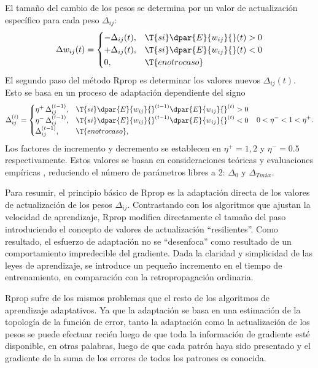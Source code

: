El tamaño del cambio de los pesos se determina por un
valor de actualización específico para cada peso $\Delta_{ij}$:
%
\begin{align}
\label{mlp20}
  \Delta{}w_{ij}(t) = 
  \begin{cases}
    -\Delta_{ij}(t), & \T{si } \dpar{E}{w_{ij}}{}(t) > 0 \\
    +\Delta_{ij}(t), & \T{si } \dpar{E}{w_{ij}}{}(t) < 0 \\
    0, & \T{en otro caso}
  \end{cases}
\end{align}
%
El segundo paso del método Rprop es determinar los valores nuevos
$\Delta_{ij}(t)$. Esto se basa en un proceso de adaptación dependiente
del signo
%
\begin{align}
\label{mlp20}
  \Delta{}_{ij}^{(t)} = 
  \begin{cases}
    \eta^+\,\Delta_{ij}^{(t-1)}, & \T{si }\dpar{E}{w_{ij}}{}^{(t-1)}
      \dpar{E}{w_{ij}}{}^{(t)} > 0 \\
    \eta^-\,\Delta_{ij}^{(t-1)}, & \T{si }\dpar{E}{w_{ij}}{}^{(t-1)}
      \dpar{E}{w_{ij}}{}^{(t)} < 0 \\
    \Delta_{ij}^{(t-1)}, & \T{en otro caso},
  \end{cases}
  && 0<\eta^-<1<\eta^+.
\end{align}
%
Los factores de incremento y decremento se establecen en $\eta^+=1,2$
y $\eta^-=0.5$ respectivamente. Estos valores se basan en
consideraciones teóricas y evaluaciones empíricas \cite{riedmiller},
reduciendo el número de parámetros libres a 2: $\Delta_0$ y
$\Delta_{T{máx}}$.

Para resumir, el principio básico de Rprop es la adaptación directa de
los valores de actualización de los pesos $\Delta_{ij}$. Contrastando
con los algoritmos que ajustan la velocidad de aprendizaje, Rprop
modifica directamente el tamaño del paso introduciendo el concepto de
valores de actualización ``resilientes''. Como resultado, el esfuerzo
de adaptación no se ``desenfoca'' como resultado de un comportamiento
impredecible del gradiente. Dada la claridad y simplicidad de las
leyes de aprendizaje, se introduce un pequeño incremento en el tiempo de
entrenamiento, en comparación con la retropropagación ordinaria.

Rprop sufre de los mismos problemas que el resto de los algoritmos de
aprendizaje adaptativos. Ya que la adaptación se basa en una
estimación de la topología de la función de error, tanto la adaptación
como la actualización de los pesos se puede efectuar recién luego de
que toda la información de gradiente esté disponible, en otras
palabras, luego de que cada patrón haya sido presentado y el gradiente
de la suma de los errores de todos los patrones es conocida.

